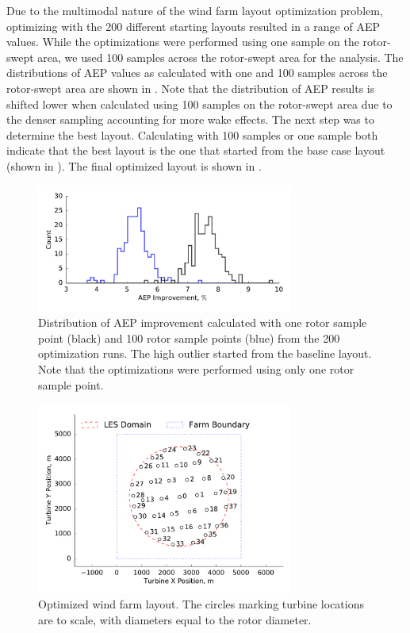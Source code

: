 \documentclass[conf]{new-aiaa}
\begin{document}
Due to the multimodal nature of the wind farm layout optimization problem, optimizing with the 200 different starting layouts resulted in a range of AEP values. While the optimizations were performed using one sample on the rotor-swept area, we used 100 samples across the rotor-swept area for the analysis. The distributions of AEP values as calculated with one and 100 samples across the rotor-swept area are shown in . Note that the distribution of AEP results is shifted lower when calculated using 100 samples on the rotor-swept area due to the denser sampling accounting for more wake effects. The next step was to determine the best layout. Calculating with 100 samples or one sample both indicate that the best layout is the one that started from the base case layout (shown in ). The final optimized layout is shown in .
%
\begin{figure}[htpb!]
	\centering
	\includegraphics[width=0.75\textwidth]{final_images/38turbs_results_hist_aep.pdf}
	\caption{Distribution of AEP improvement calculated with one rotor sample point (black) and 100 rotor sample points (blue) from the 200 optimization runs. The high outlier started from the baseline layout. Note that the optimizations were performed using only one rotor sample point.}
	\label{fig:opt-distribution}
\end{figure}
%
\begin{figure}[htpb!]
	\centering
	\includegraphics[width=0.75\textwidth]{final_images/round_farm_38Turbines_5DSpacing_finish.pdf}
	\caption{Optimized wind farm layout. The circles marking turbine locations are to scale, with diameters equal to the rotor diameter.}
	\label{fig:optimized-layout}
\end{figure}
\end{document}
